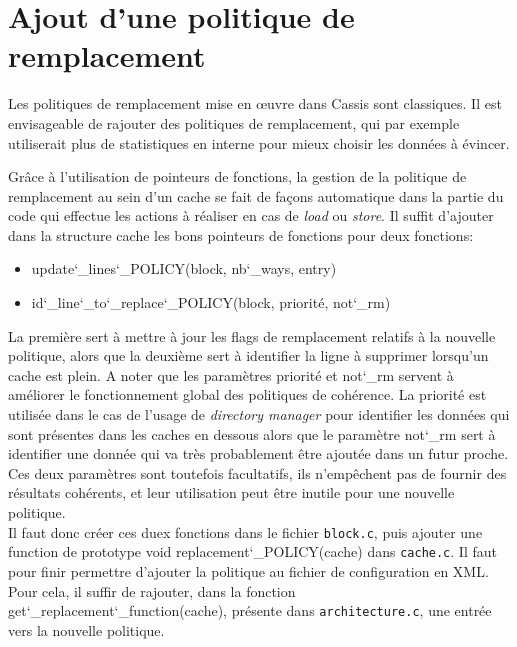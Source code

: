 \section{Ajout d'une politique de remplacement}
Les politiques de remplacement mise en {\oe}uvre dans \textsf{Cassis} sont classiques. Il est envisageable de rajouter des politiques de remplacement, qui par exemple utiliserait plus de statistiques en interne pour mieux choisir les données à évincer.

Grâce à l'utilisation de pointeurs de fonctions, la gestion de la politique de remplacement au sein d'un cache se fait de façons automatique dans la partie du code qui effectue les actions à réaliser en cas de \emph{load} ou \emph{store}. Il suffit d'ajouter dans la structure cache les bons pointeurs de fonctions pour deux fonctions: \\
\begin{itemize}
\item update\char`_lines\char`_POLICY(block, nb\char`_ways, entry)
\item id\char`_line\char`_to\char`_replace\char`_POLICY(block, priorité, not\char`_rm) \\
\end{itemize}
La première sert à mettre à jour les flags de remplacement relatifs à la nouvelle politique, alors que la deuxième sert à identifier la ligne à supprimer lorsqu'un cache est plein. A noter que les paramètres priorité et not\char`_rm servent à améliorer le fonctionnement global des politiques de cohérence. La priorité est utilisée dans le cas de l'usage de \emph{directory manager} pour identifier les données qui sont présentes dans les caches en dessous alors que le paramètre not\char`_rm sert à identifier une donnée qui va très probablement être ajoutée dans un futur proche. Ces deux paramètres sont toutefois facultatifs, ils n'empêchent pas de fournir des résultats cohérents, et leur utilisation peut être inutile pour une nouvelle politique. \\

Il faut donc créer ces duex fonctions dans le fichier \texttt{block.c}, puis ajouter une function de prototype void replacement\char`_POLICY(cache) dans \texttt{cache.c}. Il faut pour finir permettre d'ajouter la politique au fichier de configuration en XML. Pour cela, il suffir de rajouter, dans la fonction get\char`_replacement\char`_function(cache), présente dans \texttt{architecture.c}, une entrée vers la nouvelle politique. \\


